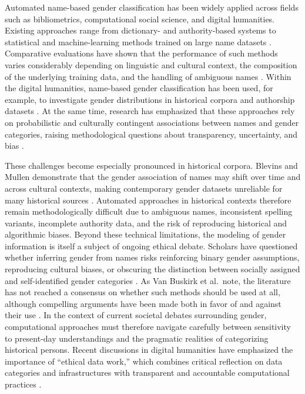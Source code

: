 \documentclass{eceasst}
\begin{document}
Automated name-based gender classification has been widely applied across fields such as bibliometrics, computational social science, and digital humanities. Existing approaches range from dictionary- and authority-based systems to statistical and machine-learning methods trained on large name datasets \cite{karimi_inferring_2016,buskirk_open-source_2023}. Comparative evaluations have shown that the performance of such methods varies considerably depending on linguistic and cultural context, the composition of the underlying training data, and the handling of ambiguous names \cite{karimi_inferring_2016,santamaria_comparison_2018}. Within the digital humanities, name-based gender classification has been used, for example, to investigate gender distributions in historical corpora and authorship datasets \cite{blevins_jane_2015}. At the same time, research has emphasized that these approaches rely on probabilistic and culturally contingent associations between names and gender categories, raising methodological questions about transparency, uncertainty, and bias \cite{buskirk_open-source_2023}.

These challenges become especially pronounced in historical corpora. Blevins and Mullen demonstrate that the gender association of names may shift over time and across cultural contexts, making contemporary gender datasets unreliable for many historical sources \cite{blevins_jane_2015}. Automated approaches in historical contexts therefore remain methodologically difficult due to ambiguous names, inconsistent spelling variants, incomplete authority data, and the risk of reproducing historical and algorithmic biases. Beyond these technical limitations, the modeling of gender information is itself a subject of ongoing ethical debate. Scholars have questioned whether inferring gender from names risks reinforcing binary gender assumptions, reproducing cultural biases, or obscuring the distinction between socially assigned and self-identified gender categories \cite{buskirk_open-source_2023}. As Van Buskirk et al.\ note, the literature has not reached a consensus on whether such methods should be used at all, although compelling arguments have been made both in favor of and against their use \cite[p.~867]{buskirk_open-source_2023}. In the context of current societal debates surrounding gender, computational approaches must therefore navigate carefully between sensitivity to present-day understandings and the pragmatic realities of categorizing historical persons. Recent discussions in digital humanities have emphasized the importance of “ethical data work,” which combines critical reflection on data categories and infrastructures with transparent and accountable computational practices \cite{lang_beyond_2026}.
\end{document}
